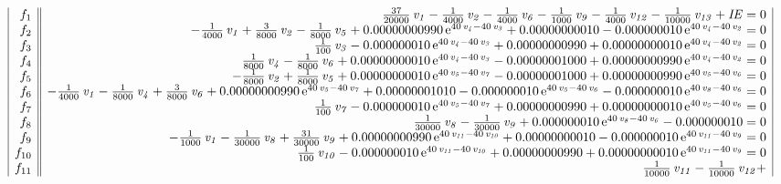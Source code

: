 \documentclass[conference,letterpaper,onecolumn]{IEEEtran}
\begin{document}
{{\tiny
\begin{equation}
\begin{array}{|r||r|} 
f_1 & {\frac {37}{20000}}\,{\it v_1}-{\frac {1}{4000}}\,{\it v_2}-{\frac {1}{
 4000}}\,{\it v_6}-{\frac {1}{1000}}\,{\it v_9}-{\frac {1}{4000}}\,{\it 
v_{12}}-{\frac {1}{10000}}\,{\it v_{13}}+{\it IE}=0 \\  
f_2 & -{\frac {1}{4000}}\,{\it v_1}+{\frac {3}{8000}}\,{\it v_2}-{\frac {1}{
8000}}\,{\it v_5}+ 0.00000000990\,{{\rm e}^{40\,{\it v_4}-40\,{\it v_3}}}
+ 0.00000000010- 0.000000010\,{{\rm e}^{40\,{\it v_4}-40\,{\it v_2}}}=0  \\  
f_3 & {\frac {1}{100}}\,{\it v_3}- 0.000000010\,{{\rm e}^{40\,{\it v_4}-40\,{
\it v_3}}}+ 0.00000000990+ 0.00000000010\,{{\rm e}^{40\,{\it v_4}-40\,{
\it v_2}}}=0 \\
f_4 & {\frac {1}{8000}}\,{\it v_4}-{\frac {1}{8000}}\,{\it v_6}+ 0.00000000010
\,{{\rm e}^{40\,{\it v_4}-40\,{\it v_3}}}- 0.00000001000+ 0.00000000990
\,{{\rm e}^{40\,{\it v_4}-40\,{\it v_2}}}=0 \\
f_5 & -{\frac {1}{8000}}\,{\it v_2}+{\frac {1}{8000}}\,{\it v_5}+
 0.00000000010\,{{\rm e}^{40\,{\it v_5}-40\,{\it v_7}}}- 0.00000001000+
 0.00000000990\,{{\rm e}^{40\,{\it v_5}-40\,{\it v_6}}}=0 \\
f_6 & -{\frac {1}{4000}}\,{\it v_1}-{\frac {1}{8000}}\,{\it v_4}+{\frac {3}{
8000}}\,{\it v_6}+ 0.00000000990\,{{\rm e}^{40\,{\it v_5}-40\,{\it v_7}}}
+ 0.00000001010- 0.000000010\,{{\rm e}^{40\,{\it v_5}-40\,{\it v_6}}}-
 0.000000010\,{{\rm e}^{40\,{\it v_8}-40\,{\it v_6}}}=0 \\
f_7 & {\frac {1}{100}}\,{\it v_7}- 0.000000010\,{{\rm e}^{40\,{\it v_5}-40\,{
\it v_7}}}+ 0.00000000990+ 0.00000000010\,{{\rm e}^{40\,{\it v_5}-40\,{
\it v_6}}}=0 \\
f_8 & {\frac {1}{30000}}\,{\it v_8}-{\frac {1}{30000}}\,{\it v_9}+ 0.000000010
\,{{\rm e}^{40\,{\it v_8}-40\,{\it v_6}}}- 0.000000010=0 \\
f_9 & -{\frac {1}{1000}}\,{\it v_1}-{\frac {1}{30000}}\,{\it v_8}+{\frac {31}{
30000}}\,{\it v_9}+ 0.00000000990\,{{\rm e}^{40\,{\it v_{11}}-40\,{\it v_{10}
}}}+ 0.00000000010- 0.000000010\,{{\rm e}^{40\,{\it v_{11}}-40\,{\it v_9}}
}=0 \\
f_{10} & {\frac {1}{100}}\,{\it v_{10}}- 0.000000010\,{{\rm e}^{40\,{\it v_{11}}-40\,
{\it v_{10}}}}+ 0.00000000990+ 0.00000000010\,{{\rm e}^{40\,{\it v_{11}}-40
\,{\it v_9}}}=0 \\
f_{11} & {\frac {1}{10000}}\,{\it v_{11}}-{\frac {1}{10000}}\,{\it v_{12}}+

\end{array}
\end{equation}}}
\end{document}
